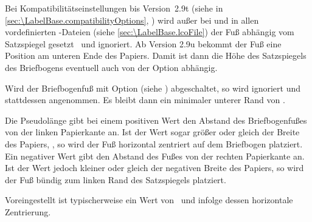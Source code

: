 Bei
Kompatibilitätseinstellungen bis
Version~2.9t (siehe  in
\autoref{sec:\LabelBase.compatibilityOptions},
) wird außer bei  und
 in allen vordefinierten
-Dateien
(siehe \autoref{sec:\LabelBase.lcoFile}) der Fuß abhängig vom Satzspiegel
gesetzt%
\iffalse %
. Damit hat dann auch \DescRef{\LabelBase.option.enlargefirstpage}%
\important{\DescRef{\LabelBase.option.enlargefirstpage}} keine Wirkung. %
\else %
\ und %
 ignoriert. %
\fi %
Ab
Version 2.9u bekommt der Fuß eine Position am unteren Ende des Papiers. Damit
ist dann die Höhe des Satzspiegels des Briefbogens eventuell auch von der
Option  abhängig.

Wird der Briefbogenfuß mit Option
%
%
(siehe ) abgeschaltet, so wird
 ignoriert und stattdessen
 angenommen. Es bleibt dann
ein minimaler unterer Rand von .%
\EndIndexGroup


\begin{Declaration}
\end{Declaration}
Die Pseudolänge
 gibt bei einem
positiven Wert den Abstand des Briefbogenfußes von der linken Papierkante
an. Ist der Wert sogar größer oder gleich der Breite des Papiers,
, so wird der Fuß horizontal
zentriert auf dem Briefbogen platziert. Ein negativer Wert gibt den Abstand
des Fußes von der rechten Papierkante an. Ist der Wert jedoch kleiner oder
gleich der negativen Breite des Papiers, so wird der Fuß bündig zum linken
Rand des Satzspiegels platziert.

Voreingestellt ist typischerweise ein Wert von
%
%
\ und infolge dessen horizontale Zentrierung.%
\EndIndexGroup



